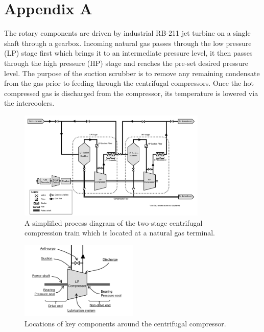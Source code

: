 \documentclass[runningheads]{llncs}
\begin{document}
\newpage
\section*{Appendix A}

The rotary components are driven by industrial RB-211 jet turbine on a single shaft through a gearbox. Incoming natural gas passes through the low pressure (LP) stage first which brings it to an intermediate pressure level, it then passes through the high pressure (HP) stage and reaches the pre-set desired pressure level. The purpose of the suction scrubber is to remove any remaining condensate from the gas prior to feeding through the centrifugal compressors. Once the hot compressed gas is discharged from the compressor, its temperature is lowered via the intercoolers.

\begin{figure}[H]
	\centering
	\includegraphics[width=0.8\textwidth]{process_diagram.PNG}
	\caption{A simplified process diagram of the two-stage centrifugal compression train which is located at a natural gas terminal.}
	\label{fig:process_diagram}
\end{figure}

\begin{figure}[H]
	\centering
	\includegraphics[width=0.5\textwidth]{lp-stage.PNG}
	\caption{Locations of key components around the centrifugal compressor.}
	\label{fig:lp_stage}
\end{figure}
\end{document}
